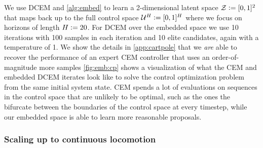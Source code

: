 \documentclass{article}
\begin{document}
We use DCEM and \cref{alg:embed}
to learn a 2-dimensional latent space ${\mathcal{Z}}\vcentcolon= [0,1]^2$ that maps
back up to the full control space ${\mathcal{U}}^H\vcentcolon= [0,1]^H$ where we
focus on horizons of length $H\vcentcolon= 20$.
For DCEM over the embedded space we use 10 iterations with
100 samples in each iteration and 10 elite candidates,
again with a temperature of 1.
We show the details in \cref{app:cartpole} that we \emph{are} able to
recover the performance of an expert CEM controller that
uses an order-of-magnitude more samples
\cref{fig:emb:cp} shows a visualization of what the CEM
and embedded DCEM iterates look like to solve the control
optimization problem from the same initial system state.
CEM spends a lot of evaluations on sequences in the control
space that are unlikely to be optimal, such as the ones the
bifurcate between the boundaries of the control space at
every timestep, while our embedded space
is able to learn more reasonable proposals.

\subsubsection{Scaling up to continuous locomotion}
\label{sec:ctrl:dmc}
\end{document}
